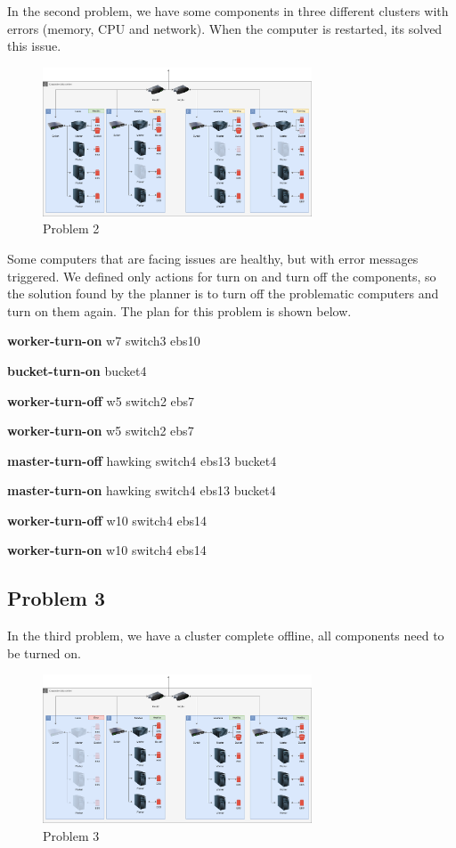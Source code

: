 \documentclass[letterpaper]{article}
\begin{document}
In the second problem, we have some components in three different clusters with errors (memory, CPU and network). When the computer is restarted, its solved this issue.

\begin{figure}[ht]
    \centering
    \includegraphics[width=8cm]{images/diagrams-pb2.png}
    \caption{Problem 2}
    \label{fig:data-center-pb2}
\end{figure}

Some computers that are facing issues are healthy, but with error messages triggered. We defined only actions for turn on and turn off the components, so the solution found by the planner is to turn off the problematic computers and turn on them again. The plan for this problem is shown below.

\textbf{worker-turn-on} w7 switch3 ebs10 

\textbf{bucket-turn-on} bucket4 

\textbf{worker-turn-off} w5 switch2 ebs7 

\textbf{worker-turn-on} w5 switch2 ebs7 

\textbf{master-turn-off} hawking switch4 ebs13 bucket4 

\textbf{master-turn-on} hawking switch4 ebs13 bucket4 

\textbf{worker-turn-off} w10 switch4 ebs14 

\textbf{worker-turn-on} w10 switch4 ebs14

\subsection{Problem 3}\label{sec:experiments3}

In the third problem, we have a cluster complete offline, all components need to be turned on.

\begin{figure}[ht]
    \centering
    \includegraphics[width=8cm]{images/diagrams-pb3.png}
    \caption{Problem 3}
    \label{fig:data-center-pb3}
\end{figure}
\end{document}
